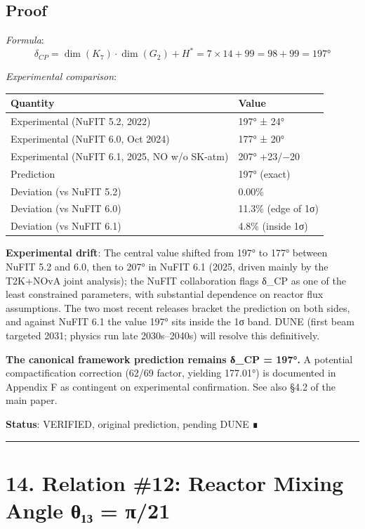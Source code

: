 \documentclass[11pt,a4paper]{article}
\begin{document}
\subsection{Proof}\label{proof-15}

\emph{Formula}: \[\delta_{CP} = \dim(K_7) \cdot \dim(G_2) + H^* = 7 \times 14 + 99 = 98 + 99 = 197°\]

\emph{Experimental comparison}:

\begin{longtable}[]{@{}ll@{}}
\toprule\noalign{}
Quantity & Value \\
\midrule\noalign{}
\endhead
\bottomrule\noalign{}
\endlastfoot
Experimental (NuFIT 5.2, 2022) & 197° ± 24° \\
Experimental (NuFIT 6.0, Oct 2024) & 177° ± 20° \\
Experimental (NuFIT 6.1, 2025, NO w/o SK-atm) & 207° +23/−20 \\
Prediction & 197° (exact) \\
Deviation (vs NuFIT 5.2) & 0.00\% \\
Deviation (vs NuFIT 6.0) & 11.3\% (edge of 1σ) \\
Deviation (vs NuFIT 6.1) & 4.8\% (inside 1σ) \\
\end{longtable}

\textbf{Experimental drift}: The central value shifted from 197° to 177° between NuFIT 5.2 and 6.0, then to 207° in NuFIT 6.1 (2025, driven mainly by the T2K+NOvA joint analysis); the NuFIT collaboration flags δ\_\allowbreak{}CP as one of the least constrained parameters, with substantial dependence on reactor flux assumptions. The two most recent releases bracket the prediction on both sides, and against NuFIT 6.1 the value 197° sits inside the 1σ band. DUNE (first beam targeted 2031; physics run late 2030s--2040s) will resolve this definitively.

\textbf{The canonical framework prediction remains δ\_\allowbreak{}CP = 197°.} A potential compactification correction (62/69 factor, yielding 177.01°) is documented in Appendix F as contingent on experimental confirmation. See also §4.2 of the main paper.

\textbf{Status}: VERIFIED, original prediction, pending DUNE ∎

\begin{center}\rule{\linewidth}{0.5pt}\end{center}

\section{14. Relation \#12: Reactor Mixing Angle θ₁₃ = π/21}\label{relation-12-reactor-mixing-angle-ux3b8ux2081ux2083-ux3c021}
\end{document}
